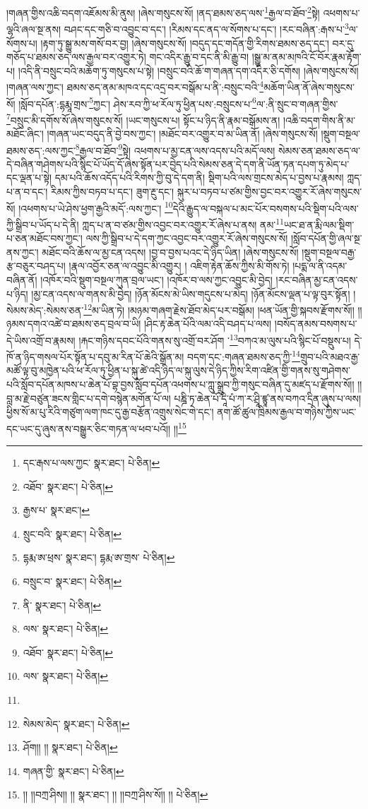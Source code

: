 །གཞན་གྱིས་འཆི་བདག་འཇོམས་མི་ནུས། །ཞེས་གསུངས་སོ། །ནད་ཐམས་ཅད་ལས་\footnote{དང་རྒས་པ་ལས་ཀྱང་  སྣར་ཐང་།  པེ་ཅིན། }རྒྱལ་བ་ཐོབ་\footnote{འཐོབ་  སྣར་ཐང་།  པེ་ཅིན། }སྟེ། འཕགས་པ་ལྷའི་ཞལ་སྔ་ནས། བཤང་དང་གཅི་བ་འབྱུང་བ་དང་། །རིམས་དང་ནད་ལ་སོགས་པ་དང་། །རང་བཞིན་:རྒས་པ་\footnote{རྒྱས་པ་  སྣར་ཐང་། }ལ་སོགས་པ། །རྟག་ཏུ་སྒྱུ་མས་གསོ་བར་བྱ། །ཞེས་གསུངས་སོ། །བདུད་དང་གདོན་གྱི་རིགས་ཐམས་ཅད་དང་། བར་དུ་གཅོད་པ་ཐམས་ཅད་ལས་རྒྱལ་བར་འགྱུར་ཏེ། གང་འདིར་རྒྱུ་བ་དང་ནི་མི་རྒྱུ་བ། །སྒྱུ་མ་ནམ་མཁའི་ངོ་བོར་རྣམ་རྟོག་པ། །འདི་ནི་བསྲུང་བའི་མཆོག་ཏུ་གསུངས་པ་སྟེ། །བསྲུང་བའི་ཆོ་ག་གཞན་དག་འདིར་ཅི་དགོས། །ཞེས་གསུངས་སོ། །གཞན་ལས་ཀྱང་། ཐམས་ཅད་ནམ་མཁའ་དང་འདྲ་བར་བསྒོམ་པ་ནི་:བསྲུང་བའི་\footnote{སྲུང་བའི་  སྣར་ཐང་།  པེ་ཅིན། }མཆོག་ཡིན་ནོ་ཞེས་གསུངས་སོ། །སློབ་དཔོན་:དྷརྨཱ་གྲས་\footnote{དྷརྨ་ཨ་ཕྲས་  སྣར་ཐང་། དྷརྨ་ཨ་གྲས་  པེ་ཅིན། }ཀྱང་། ཤེས་རབ་ཀྱི་ཕ་རོལ་ཏུ་ཕྱིན་པས་:བསྲུངས་པ་\footnote{བསྲུང་བ་  སྣར་ཐང་།  པེ་ཅིན། }ལ་:ནི་སྲུང་བ་གཞན་གྱིས་\footnote{ནི་  སྣར་ཐང་།  པེ་ཅིན། }བསྲུང་མི་དགོས་སོ་ཞེས་གསུངས་སོ། །ཡང་གསུངས་པ། སྟོང་པ་ཉིད་ནི་རྣམ་བསྒོམས་ན། །འཆི་བདག་གིས་ནི་མ་མཐོང་ཞིང་། །གཞན་ཡང་བདུད་ནི་བྱེ་བས་ཀྱང་། །མཐོང་བར་འགྱུར་བ་མ་ཡིན་ནོ། །ཞེས་གསུངས་སོ། །སྡུག་བསྔལ་ཐམས་ཅད་:ལས་ཀྱང་\footnote{ལས་  སྣར་ཐང་།  པེ་ཅིན། }རྒྱལ་བ་ཐོབ་\footnote{འཐོབ་  སྣར་ཐང་།  པེ་ཅིན། }སྟེ། འཕགས་པ་མྱ་ངན་ལས་འདས་པའི་མདོ་ལས། སེམས་ཅན་ཐམས་ཅད་ལ་དེ་བཞིན་གཤེགས་པའི་སྙིང་པོ་ཡོད་དོ་ཞེས་སྟོན་པར་བྱེད་པའི་སེམས་ཅན་དེ་དག་ནི་ཡོན་ཏན་དཔག་ཏུ་མེད་པ་དང་ལྡན་པ་སྟེ། དམ་པའི་ཆོས་འདོད་པའི་རིགས་ཀྱི་བུ་དེ་དག་ནི། སྡིག་པའི་ལས་གྲངས་མེད་པ་བྱས་པ་རྣམས། ཀླད་པ་ན་བ་དང་། རིམས་ཀྱིས་བཏབ་པ་དང་། ཟུག་རྔུ་དང་། སྐུར་པ་བཏབ་པ་ཙམ་གྱིས་བྱང་བར་འགྱུར་རོ་ཞེས་གསུངས་སོ། །འཕགས་པ་ཡེ་ཤེས་ཕྱག་རྒྱའི་མདོ་:ལས་ཀྱང་། \footnote{ལས་  སྣར་ཐང་།  པེ་ཅིན། }དེའི་རྒྱུད་ལ་བསྐལ་པ་མང་པོར་བསགས་པའི་སྡིག་པའི་ལས་ཀྱི་སྒྲིབ་པ་ཡོད་པ་དེ་ནི། ཀླད་པ་ན་བ་ཙམ་གྱིས་འབྱང་བར་འགྱུར་རོ་ཞེས་པ་ནས། ནམ་\footnote{}ཡང་ཐ་ན་རྨི་ལམ་སྡིག་པ་ཅན་མཐོང་བས་ཀྱང་། ལས་ཀྱི་སྒྲིབ་པ་དེ་དག་ཀྱང་འབྱང་བར་འགྱུར་རོ་ཞེས་གསུངས་སོ། །སློབ་དཔོན་གྱི་ཞལ་སྔ་ནས་ཀྱང་། མཐོང་བའི་ཆོས་ལ་མྱ་ངན་འདས། །བྱ་བ་བྱས་པའང་དེ་ཉིད་ཡིན། །ཞེས་གསུངས་སོ། །སྡུག་བསྔལ་བརྒྱ་རྩ་བཅུར་བཤད་པ། །རྣལ་འབྱོར་ཅན་ལ་འབྱུང་མི་འགྱུར། །
འཇིག་རྟེན་ཆོས་ཀྱིས་མི་གོས་ཏེ། །པདྨ་ལ་ནི་འདམ་བཞིན་ནོ། །འཁོར་བའི་སྡུག་བསྔལ་ཀུན་བྲལ་ཡང་། །འཁོར་བ་ལས་ཀྱང་འབྱུང་མི་བྱེད། །རང་བཞིན་མྱ་ངན་འདས་པ་ཉིད། །མྱ་ངན་འདས་ལ་གནས་མི་བྱེད། །ཉོན་མོངས་མེ་ཡིས་གདུངས་པ་མེད། །ཉོན་མོངས་ལྡན་པ་ལྟ་བུར་སྟོན། །སེམས་མེད་:སེམས་ཅན་\footnote{སེམས་མེད་  སྣར་ཐང་།  པེ་ཅིན། }མ་ཡིན་ཏེ། །མཉམ་གཞག་རྗེས་ཐོབ་མེད་པར་བསྒོམ། །ཕན་ཡོན་གྱི་སྐབས་རྫོགས་སོ།། །།ཉམས་དགའ་འཚེ་བ་ཐམས་ཅད་བྲལ་བ་ཡི། །ཤིང་རྟ་ཆེན་པོའི་ལམ་འདི་བཤད་པ་ལས། །བསོད་ནམས་བསགས་པ་དེ་ཡིས་འགྲོ་བ་རྣམས། །རྐང་གཉིས་དབང་པོའི་གནས་སུ་འགྲོ་བར་ཤོག ་\footnote{ཤོག།། །།  སྣར་ཐང་།  པེ་ཅིན། }བཀའ་མ་ལུས་པའི་སྙིང་པོ་བསྡུས་པ། དེ་ཁོ་ན་ཉིད་གསལ་པོར་སྟོན་པ་དབུ་མ་རིན་པོ་ཆེའི་སྒྲོན་མ། བདག་དང་:གཞན་ཐམས་ཅད་ཀྱི་\footnote{གཞན་གྱི་  སྣར་ཐང་།  པེ་ཅིན། }གྲུབ་པའི་མཐའ་རྒྱ་མཚོ་ལྟ་བུ་མཁྱེན་པའི་ཕ་རོལ་ཏུ་ཕྱིན་པ་སྐུ་ཚེ་འདི་ཉིད་ལ་སྐུ་ལུས་དེ་ཉིད་ཀྱིས་རིག་འཛིན་གྱི་གནས་སུ་གཤེགས་པའི་སློབ་དཔོན་མཁས་པ་ཆེན་པོ་བྷ་བྱས་སློབ་དཔོན་འཕགས་པ་ཀླུ་སྒྲུབ་ཀྱི་གསུང་བཞིན་དུ་མཛད་པ་རྫོགས་སོ།། །།བླ་མ་རྗེ་བཙུན་ཟངས་གླིང་པ་དགེ་བསྙེན་མགོན་པོ་ལ། པཎྜི་ཏ་ཆེན་པོ་དཱི་པཾ་ཀ་ར་ཤྲཱི་ཛྙཱ་ནས་བཀའ་དྲིན་ཞུས་པ་ལས། ཕྱིས་སོ་མ་པུ་རིའི་གཙུག་ལག་ཁང་དུ་རྒྱ་བརྩོན་འགྲུས་སེང་གེ་དང་། ནག་ཚོ་ཚུལ་ཁྲིམས་རྒྱལ་བ་གཉིས་ཀྱིས་ཡང་དང་ཡང་དུ་ཞུས་ནས་བསྒྱུར་ཅིང་གཏན་ལ་ཕབ་པའོ།། །།\footnote{།། །།བཀྲ་ཤིས།། །།  སྣར་ཐང་། །། །།བཀྲ་ཤིས་སོ།། །།  པེ་ཅིན། }